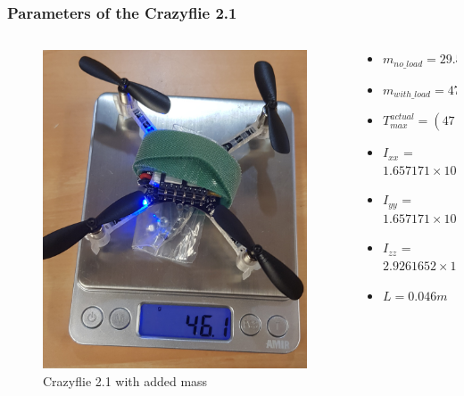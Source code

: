 \documentclass{thesisbeamer}
\newcommand\Fontvi{\fontsize{9}{10}\selectfont}
\begin{document}
\begin{frame}
	\frametitle{Parameters of the Crazyflie 2.1}
	\Fontvi
	
    \begin{columns}
        \begin{column}{0.4\textwidth}
            \begin{figure}
                \centering
                \includegraphics[height=0.5\textheight, angle =-90]{Images/crazyflie/max_thrust.jpg}
                \caption{Crazyflie 2.1 with added mass}
            \end{figure}
        \end{column}
        \begin{column}{0.6\textwidth}
            \begin{itemize}
                \item $m_{no\_load} =  29.5 g $
                \item $m_{with\_load} = 47 g $
                \item $T_{max}^{actual} = (47 \times 10^{-3} kg) 9.81 \frac{m}{s^2} = 0.46N $
				\item $I_{xx}$ = $1.657171 \times 10^{-5}  kg.m^2$
				\item $I_{yy}$ = $1.657171 \times 10^{-5}  kg.m^2$
				\item $I_{zz}$ = $2.9261652 \times 10^{-5} kg.m^2$
				\item $L = 0.046m$            
            \end{itemize}
        \end{column}
    \end{columns}
\end{frame}
\end{document}
